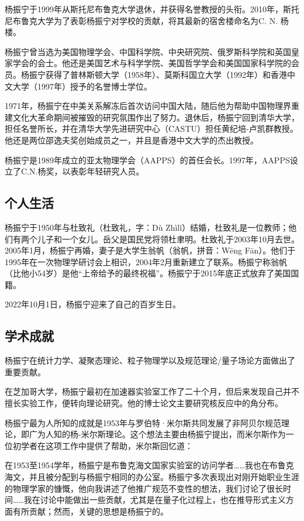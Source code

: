 杨振宁于1999年从斯托尼布鲁克大学退休，并获得名誉教授的头衔。2010年，斯托尼布鲁克大学为了表彰杨振宁对学校的贡献，将其最新的宿舍楼命名为C. N. 杨楼。

杨振宁曾当选为美国物理学会、中国科学院、中央研究院、俄罗斯科学院和英国皇家学会的会士。他还是美国艺术与科学学院、美国哲学学会和美国国家科学院的会员。杨振宁获得了普林斯顿大学（1958年）、莫斯科国立大学（1992年）和香港中文大学（1997年）授予的名誉博士学位。

1971年，杨振宁在中美关系解冻后首次访问中国大陆，随后他为帮助中国物理界重建文化大革命期间被摧毁的研究氛围作出了努力。退休后，杨振宁回到清华大学，担任名誉所长，并在清华大学先进研究中心（CASTU）担任黄纪培-卢凯群教授。他还是两位邵逸夫奖创始成员之一，并且是香港中文大学的杰出教授。

杨振宁是1989年成立的亚太物理学会（AAPPS）的首任会长。1997年，AAPPS设立了C.N.杨奖，以表彰年轻研究人员。
\subsection{个人生活}
杨振宁于1950年与杜致礼（杜致礼，字：Dù Zhìlǐ）结婚，杜致礼是一位教师；他们有两个儿子和一个女儿。岳父是国民党将领杜聿明。杜致礼于2003年10月去世。2005年1月，杨振宁再婚，妻子是大学生翁帆（翁帆，拼音：Wēng Fān）。他们于1995年在一次物理学研讨会上相识，2004年2月重新建立了联系。杨振宁称翁帆（比他小54岁）是他“上帝给予的最终祝福”。杨振宁于2015年底正式放弃了美国国籍。

2022年10月1日，杨振宁迎来了自己的百岁生日。
\subsection{学术成就}

杨振宁在统计力学、凝聚态理论、粒子物理学以及规范理论/量子场论方面做出了重要贡献。

在芝加哥大学，杨振宁最初在加速器实验室工作了二十个月，但后来发现自己并不擅长实验工作，便转向理论研究。他的博士论文主要研究核反应中的角分布。

杨振宁最为人所知的成就是1953年与罗伯特·米尔斯共同发展了非阿贝尔规范理论，即广为人知的杨-米尔斯理论。这个想法主要由杨振宁提出，而米尔斯作为一位初学者在这项工作中提供了帮助，米尔斯回忆道：

在1953至1954学年，杨振宁是布鲁克海文国家实验室的访问学者……我也在布鲁克海文，并且被分配到与杨振宁相同的办公室。杨振宁多次表现出对刚开始职业生涯的物理学家的慷慨，他向我讲述了他推广规范不变性的想法，我们讨论了很长时间……我在讨论中能做出一些贡献，尤其是在量子化过程上，也在推导形式主义方面有所贡献；然而，关键的思想是杨振宁的。

